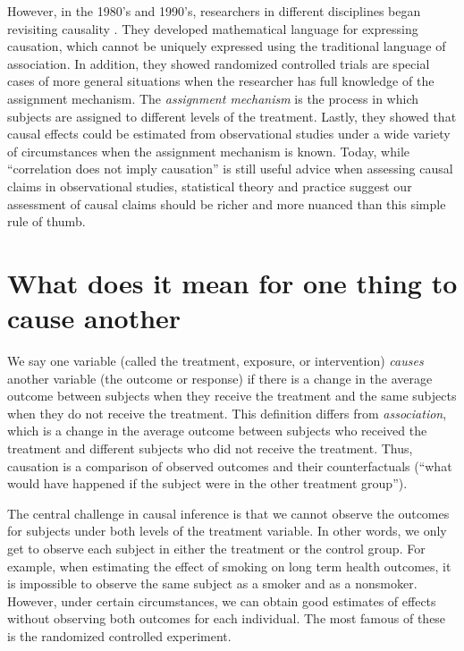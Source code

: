 \documentclass[]{book}
\begin{document}
However, in the 1980's and 1990's, researchers in different disciplines began revisiting causality \citep{greenland1986identifiability, pearl1993bayesian, angrist1995identification}. They developed mathematical language for expressing causation, which cannot be uniquely expressed using the traditional language of association. In addition, they showed randomized controlled trials are special cases of more general situations when the researcher has full knowledge of the assignment mechanism. The \emph{assignment mechanism} is the process in which subjects are assigned to different levels of the treatment. Lastly, they showed that causal effects could be estimated from observational studies under a wide variety of circumstances when the assignment mechanism is known. Today, while ``correlation does not imply causation'' is still useful advice when assessing causal claims in observational studies, statistical theory and practice suggest our assessment of causal claims should be richer and more nuanced than this simple rule of thumb.

\hypertarget{what-does-it-mean-for-one-thing-to-cause-another}{%
\section{What does it mean for one thing to cause another}\label{what-does-it-mean-for-one-thing-to-cause-another}}

We say one variable (called the treatment, exposure, or intervention) \emph{causes} another variable (the outcome or response) if there is a change in the average outcome between subjects when they receive the treatment and the same subjects when they do not receive the treatment. This definition differs from \emph{association}, which is a change in the average outcome between subjects who received the treatment and different subjects who did not receive the treatment. Thus, causation is a comparison of observed outcomes and their counterfactuals (``what would have happened if the subject were in the other treatment group'').

The central challenge in causal inference is that we cannot observe the outcomes for subjects under both levels of the treatment variable. In other words, we only get to observe each subject in either the treatment or the control group. For example, when estimating the effect of smoking on long term health outcomes, it is impossible to observe the same subject as a smoker and as a nonsmoker. However, under certain circumstances, we can obtain good estimates of effects without observing both outcomes for each individual. The most famous of these is the randomized controlled experiment.
\end{document}
